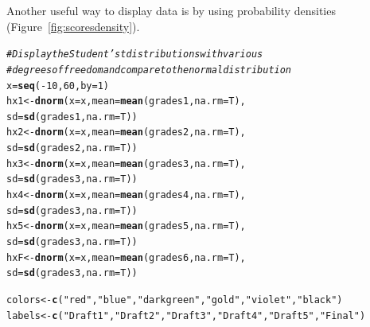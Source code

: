 \documentclass{article}\usepackage[]{graphicx}\usepackage[]{color}
\makeatletter
\newcommand{\hlnum}[1]{\textcolor[rgb]{0.686,0.059,0.569}{#1}}%
\newcommand{\hlstr}[1]{\textcolor[rgb]{0.192,0.494,0.8}{#1}}%
\newcommand{\hlcom}[1]{\textcolor[rgb]{0.678,0.584,0.686}{\textit{#1}}}%
\newcommand{\hlopt}[1]{\textcolor[rgb]{0,0,0}{#1}}%
\newcommand{\hlstd}[1]{\textcolor[rgb]{0.345,0.345,0.345}{#1}}%
\newcommand{\hlkwb}[1]{\textcolor[rgb]{0.69,0.353,0.396}{#1}}%
\newcommand{\hlkwc}[1]{\textcolor[rgb]{0.333,0.667,0.333}{#1}}%
\newcommand{\hlkwd}[1]{\textcolor[rgb]{0.737,0.353,0.396}{\textbf{#1}}}%
\newenvironment{kframe}{%
 \def\at@end@of@kframe{}%
 \ifinner\ifhmode%
  \def\at@end@of@kframe{\end{minipage}}%
  \begin{minipage}{\columnwidth}%
 \fi\fi%
 \def\FrameCommand##1{\hskip\@totalleftmargin \hskip-\fboxsep
 \colorbox{shadecolor}{##1}\hskip-\fboxsep
     \hskip-\linewidth \hskip-\@totalleftmargin \hskip\columnwidth}%
 \MakeFramed {\advance\hsize-\width
   \@totalleftmargin\z@ \linewidth\hsize
   \@setminipage}}%
 {\par\unskip\endMakeFramed%
 \at@end@of@kframe}
\newenvironment{knitrout}{}{} %
\makeatother
\begin{document}
Another useful way to display data is by using probability densities (Figure~\ref{fig:scoresdensity}). 
\begin{knitrout}
\color{fgcolor}\begin{kframe}
\begin{alltt}
\hlcom{# Display the Student's t distributions with various}
\hlcom{# degrees of freedom and compare to the normal distribution}
\hlstd{x} \hlkwb{=} \hlkwd{seq}\hlstd{(}\hlopt{-}\hlnum{10}\hlstd{,} \hlnum{60}\hlstd{,} \hlkwc{by} \hlstd{=} \hlnum{1}\hlstd{)}
\hlstd{hx1} \hlkwb{<-} \hlkwd{dnorm}\hlstd{(}\hlkwc{x}\hlstd{= x,} \hlkwc{mean} \hlstd{=} \hlkwd{mean}\hlstd{(grades1,} \hlkwc{na.rm}\hlstd{=T),}
             \hlkwc{sd}\hlstd{=}\hlkwd{sd}\hlstd{(grades1,} \hlkwc{na.rm}\hlstd{=T))}
\hlstd{hx2} \hlkwb{<-} \hlkwd{dnorm}\hlstd{(}\hlkwc{x}\hlstd{= x,} \hlkwc{mean} \hlstd{=} \hlkwd{mean}\hlstd{(grades2,} \hlkwc{na.rm}\hlstd{=T),}
             \hlkwc{sd}\hlstd{=} \hlkwd{sd}\hlstd{(grades2,} \hlkwc{na.rm}\hlstd{=T))}
\hlstd{hx3} \hlkwb{<-} \hlkwd{dnorm}\hlstd{(}\hlkwc{x}\hlstd{= x,} \hlkwc{mean} \hlstd{=} \hlkwd{mean}\hlstd{(grades3,} \hlkwc{na.rm}\hlstd{=T),}
             \hlkwc{sd}\hlstd{=} \hlkwd{sd}\hlstd{(grades3,} \hlkwc{na.rm}\hlstd{=T))}
\hlstd{hx4} \hlkwb{<-} \hlkwd{dnorm}\hlstd{(}\hlkwc{x}\hlstd{= x,} \hlkwc{mean} \hlstd{=} \hlkwd{mean}\hlstd{(grades4,} \hlkwc{na.rm}\hlstd{=T),}
             \hlkwc{sd}\hlstd{=} \hlkwd{sd}\hlstd{(grades3,} \hlkwc{na.rm}\hlstd{=T))}
\hlstd{hx5} \hlkwb{<-} \hlkwd{dnorm}\hlstd{(}\hlkwc{x}\hlstd{= x,} \hlkwc{mean} \hlstd{=} \hlkwd{mean}\hlstd{(grades5,} \hlkwc{na.rm}\hlstd{=T),}
             \hlkwc{sd}\hlstd{=} \hlkwd{sd}\hlstd{(grades3,} \hlkwc{na.rm}\hlstd{=T))}
\hlstd{hxF} \hlkwb{<-} \hlkwd{dnorm}\hlstd{(}\hlkwc{x}\hlstd{= x,} \hlkwc{mean} \hlstd{=} \hlkwd{mean}\hlstd{(grades6,} \hlkwc{na.rm}\hlstd{=T),}
             \hlkwc{sd}\hlstd{=} \hlkwd{sd}\hlstd{(grades3,} \hlkwc{na.rm}\hlstd{=T))}

\hlstd{colors} \hlkwb{<-} \hlkwd{c}\hlstd{(}\hlstr{"red"}\hlstd{,} \hlstr{"blue"}\hlstd{,} \hlstr{"darkgreen"}\hlstd{,} \hlstr{"gold"}\hlstd{,} \hlstr{"violet"}\hlstd{,} \hlstr{"black"}\hlstd{)}
\hlstd{labels} \hlkwb{<-} \hlkwd{c}\hlstd{(}\hlstr{"Draft 1"}\hlstd{,} \hlstr{"Draft 2"}\hlstd{,} \hlstr{"Draft 3"}\hlstd{,} \hlstr{"Draft 4"}\hlstd{,} \hlstr{"Draft 5"}\hlstd{,} \hlstr{"Final"}\hlstd{)}


\end{alltt}
\end{kframe}
\end{knitrout}
\end{document}
